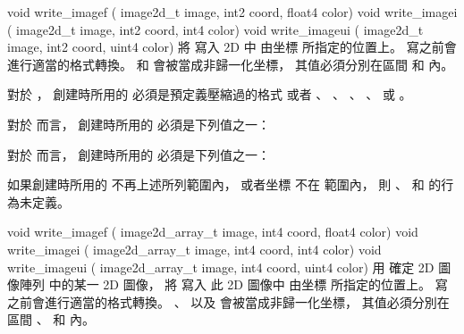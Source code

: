void write_imagef (
	image2d_t image,
	int2 coord,
	float4 color)
void write_imagei (
	image2d_t image,
	int2 coord,
	int4 color)
void write_imageui (
	image2d_t image,
	int2 coord,
	uint4 color)
\stopbuffer
{}
將  寫入 2D   中
由坐標  所指定的位置上。
寫之前會進行適當的格式轉換。
 和  會被當成非歸一化坐標，
其值必須分別在區間 
和  內。

對於 ，
創建時所用的  必須是預定義壓縮過的格式
或者 、 、 、
 、  或 。

對於  而言，
創建時所用的  必須是下列值之一：
\startigBase
\item {}
\item {}
\item {}
\stopigBase

對於  而言，
創建時所用的  必須是下列值之一：
\startigBase
\item {}
\item {}
\item {}
\stopigBase

如果創建時所用的  不再上述所列範圍內，
或者坐標  不在 
範圍內，
則 、  和  的行為未定義。
\stopbuffer

void write_imagef (
	image2d_array_t image,
	int4 coord,
	float4 color)
void write_imagei (
	image2d_array_t image,
	int4 coord,
	int4 color)
void write_imageui (
	image2d_array_t image,
	int4 coord,
	uint4 color)
\stopbuffer
{}
用  確定 2D 圖像陣列  中的某一 2D 圖像，
將  寫入 此 2D 圖像中
由坐標  所指定的位置上。
寫之前會進行適當的格式轉換。
、  以及  會被當成非歸一化坐標，
其值必須分別在區間 、
 和  內。

